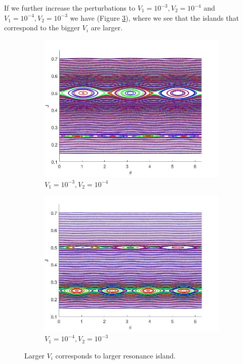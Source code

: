 If we further increase the perturbations to $V_1=10^{-3},V_2=10^{-4}$ and $V_1=10^{-4},V_2=10^{-3}$ we have (Figure \ref{fig2.3}), where we see that the islands that correspond to the bigger $V_i$ are larger.\\
%
\begin{figure}[h!]
	\centering
	\begin{subfigure}{.5\textwidth}
  		\includegraphics[scale=0.5,left]{Hamiltonian_1/numerical/figs/Q5_1e-3.1e-4_3634}
  		\caption{$V_1=10^{-3},V_2=10^{-4}$}
  		\label{fig2.3a}
	\end{subfigure}%
	\begin{subfigure}{.5\textwidth}
  		\includegraphics[scale=0.5,right]{Hamiltonian_1/numerical/figs/Q5_1e-4.1e-3_3634}
  		\caption{$V_1=10^{-4},V_2=10^{-3}$}
  		\label{fig2.3b}
	\end{subfigure}
	\caption{Larger $V_i$ corresponds to larger resonance island.}
	\label{fig2.3}
\end{figure}
